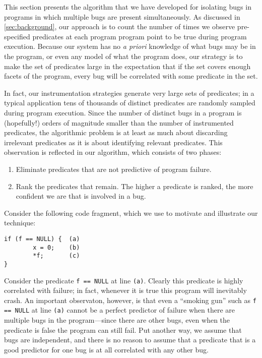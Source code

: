 
This section presents the algorithm that we have developed for
isolating bugs in programs in which multiple bugs are present
simultaneously.  As discussed in \autoref{sec:background}, our
approach is to count the number of times we observe pre-specified
predicates at each program program point to be true during program
execution.  Because our system has no {\em a priori} knowledge of what bugs
may be in the program, or even any model of what the program does, our
strategy is to make the set of predicates large in the expectation that
if the set covers enough facets of the program, every bug will be correlated
with some predicate in the set.

In fact, our instrumentation strategies generate very large sets
of predicates; in a typical application tens of thousands of distinct
predicates are randomly sampled during program execution.  Since the
number of distinct bugs in a program is (hopefully!) orders of
magnitude smaller than the number of instrumented predicates, the
algorithmic problem is at least as much about discarding irrelevant
predicates as it is about identifying relevant predicates.  This
observation is reflected in our algorithm, which consists of two phases:
\begin{enumerate}
\item Eliminate predicates that are not predictive of program failure.

\item Rank the predicates that remain.  The higher a predicate is ranked,
the more confident we are that is involved in a bug.
\end{enumerate}

Consider the following code fragment, which we use to motivate and illustrate
our technique:
\begin{verbatim}
if (f == NULL) {  (a)
        x = 0;    (b)
        *f;       (c)
}
\end{verbatim}
Consider the predicate {\tt f == NULL} at line {\tt (a)}.  Clearly
this predicate is highly correlated with failure; in fact, whenever it
is true this program will inevitably crash.  An important observaton,
however, is that even a ``smoking gun'' such as {\tt f == NULL} at
line {\tt (a)} cannot be a perfect predictor of failure when there are
multiple bugs in the program---since there are other bugs, even when
the predicate is false the program can still fail.  Put another way, we assume
that bugs are independent, and there is no reason to assume that
a predicate that is a good predictor for one bug is at all correlated
with any other bug.

